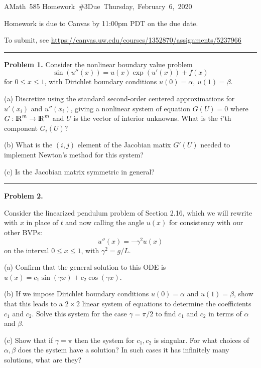 \documentclass[10pt]{article}
\begin{document}
\hfill\vbox{\hbox{AMath 585}
\hbox{Homework \#3}\hbox{Due Thursday, February 6, 2020}}

\vskip 5pt

Homework is due to Canvas by 11:00pm PDT on the due date.

To submit, see
\url{https://canvas.uw.edu/courses/1352870/assignments/5237966}


\vskip 1cm
\hrule
{\bf Problem 1.}
Consider the nonlinear boundary value problem 
\[
\sin(u''(x)) = u(x)\exp(u'(x)) + f(x)
\]
for $0\leq x \leq 1$, 
with Dirichlet boundary conditions $u(0) = \alpha, ~u(1) = \beta$.

(a) Discretize using the standard second-order centered approximations for
$u'(x_i)$ and $u''(x_i)$, giving a nonlinear system of equation $G(U)=0$
where $G:{{\rm l} \kern -.15em {\rm R} }^m \rightarrow {{\rm l} \kern -.15em {\rm R} }^m$ and $U$ is the vector of interior
unknowns.  What is the $i$'th component  $G_i(U)$?

(b) What is the $(i,j)$ element of the Jacobian matix $G'(U)$
needed to implement Newton's method for this system? 

(c) Is the Jacobian matrix symmetric in general? 




\vskip 1cm
\hrule
{\bf Problem 2.}

Consider the linearized pendulum problem of Section 2.16, 
which we will rewrite with $x$ in place of $t$ and now calling the angle
$u(x)$ for consistency with our other BVPs:
\[
u''(x) = -\gamma^2 u(x)
\]
on the interval $0 \leq x \leq 1$, with $\gamma^2 = g/L$.  

(a) Confirm that the general solution to this ODE is 
$u(x) = c_1 \sin(\gamma x) + c_2 \cos(\gamma x)$.

(b) If we impose Dirichlet boundary conditions $u(0)=\alpha$ and $u(1) =
\beta$, show that this leads to a $2\times 2$ linear system of equations to
determine the coefficients $c_1$ and $c_2$. Solve this system for the case
$\gamma = \pi/2$ to find $c_1$ and $c_2$ in terms of $\alpha$ and
$\beta$. 

(c) Show that if $\gamma = \pi$ then the system for $c_1, c_2$ is
singular.  For what choices of $\alpha,\beta$ does the system have a
solution? In such cases it has infinitely many solutions, what are they?
\end{document}
